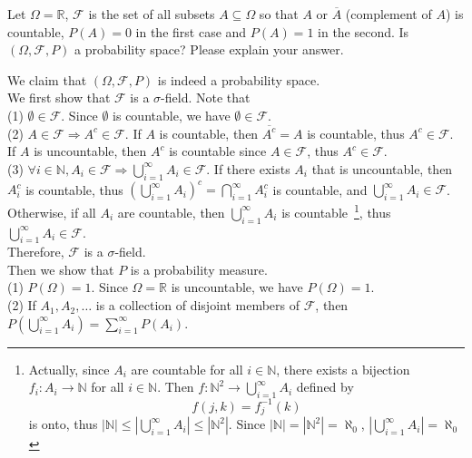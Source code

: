 \documentclass[a4paper, justified]{tufte-handout}
\begin{document}
\begin{problem}
  Let \(\Omega = \mathbb{R}\), \(\mathcal{F}\) is the set of all subsets \(A \subseteq \Omega\) so that \(A\) or \(\overline{A}\) (complement of \(A\)) is countable, \(P(A) = 0\) in the first case and \(P(A) = 1\) in the second. Is \((\Omega,\mathcal{F},P)\) a probability space? Please explain your answer.
\end{problem}

\begin{solution}
  We claim that $(\Omega, \mathcal{F}, P)$ is indeed a probability space. \\
  We first show that $\mathcal{F}$ is a $\sigma$-field. Note that\\
  (1) $\emptyset \in \mathcal{F}$. Since $\emptyset$ is countable, we have $\emptyset \in \mathcal{F}$.\\
  (2) $A \in \mathcal{F} \Rightarrow A^c \in \mathcal{F}$. If $A$ is countable, then $\overline{A^c} = A$ is countable, thus $A^c \in \mathcal{F}$. If $A$ is uncountable, then $A^c$ is countable since $A\in \mathcal{F}$, thus $A^c \in \mathcal{F}$.\\
  (3) $\forall i \in \mathbb{N}, A_i \in \mathcal{F} \Rightarrow \bigcup_{i=1}^\infty A_i \in \mathcal{F}$. If there exists $A_i$ that is uncountable, then $A_i^c$ is countable, thus $(\bigcup_{i=1}^\infty A_i)^c = \bigcap_{i=1}^\infty A_i^c$ is countable, and $\bigcup_{i=1}^\infty A_i \in \mathcal{F}$. Otherwise, if all $A_i$ are countable, then $\bigcup_{i=1}^\infty A_i$ is countable~\footnote{Actually, since $A_i$ are countable for all $i \in \mathbb{N}$, there exists a bijection $f_i:A_i \to \mathbb{N}$ for all $i \in \mathbb{N}$. Then $f:\mathbb{N}^2 \to \bigcup_{i=1}^\infty A_i$ defined by \[f(j, k) = f_j^{-1}(k)\] is onto, thus $|\mathbb{N}| \le |\bigcup_{i=1}^\infty A_i| \le |\mathbb{N}^2|$. Since $|\mathbb{N}| = |\mathbb{N}^2| = \aleph_0$, $|\bigcup_{i=1}^\infty A_i| = \aleph_0$}, thus $\bigcup_{i=1}^\infty A_i \in \mathcal{F}$.\\
  Therefore, $\mathcal{F}$ is a $\sigma$-field.\\
  Then we show that $P$ is a probability measure.\\
  (1) $P(\Omega) = 1$. Since $\Omega = \mathbb{R}$ is uncountable, we have $P(\Omega) = 1$.\\
  (2) If $A_1, A_2, \ldots$ is a collection of disjoint members of $\mathcal{F}$, then $P(\bigcup_{i=1}^\infty A_i) = \sum_{i=1}^\infty P(A_i)$. 
  \begin{itemize}

\end{itemize}
\end{solution}
\end{document}
